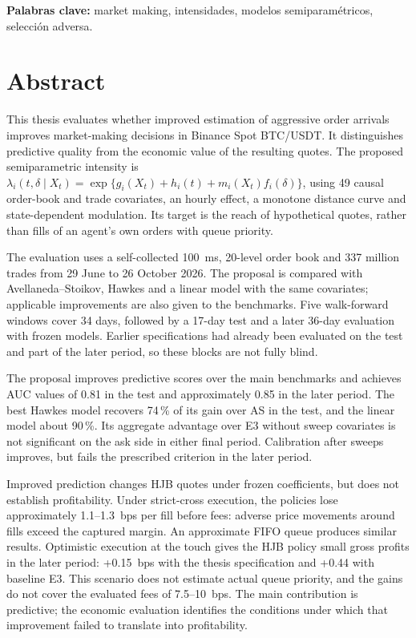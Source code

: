 \medskip
\noindent\textbf{Palabras clave:} market making, intensidades, modelos semiparamétricos, selección adversa.

\chapter*{Abstract}

This thesis evaluates whether improved estimation of aggressive order arrivals improves market-making decisions in Binance Spot BTC/USDT. It distinguishes predictive quality from the economic value of the resulting quotes. The proposed semiparametric intensity is
$\lambda_i(t,\delta\mid X_t)=\exp\{g_i(X_t)+h_i(t)+m_i(X_t)f_i(\delta)\}$,
using 49 causal order-book and trade covariates, an hourly effect, a monotone distance curve and state-dependent modulation. Its target is the reach of hypothetical quotes, rather than fills of an agent's own orders with queue priority.

The evaluation uses a self-collected 100~ms, 20-level order book and 337 million trades from 29 June to 26 October 2026. The proposal is compared with Avellaneda--Stoikov, Hawkes and a linear model with the same covariates; applicable improvements are also given to the benchmarks. Five walk-forward windows cover 34 days, followed by a 17-day test and a later 36-day evaluation with frozen models. Earlier specifications had already been evaluated on the test and part of the later period, so these blocks are not fully blind.

The proposal improves predictive scores over the main benchmarks and achieves AUC values of 0.81 in the test and approximately 0.85 in the later period. The best Hawkes model recovers 74\,\% of its gain over AS in the test, and the linear model about 90\,\%. Its aggregate advantage over E3 without sweep covariates is not significant on the ask side in either final period. Calibration after sweeps improves, but fails the prescribed criterion in the later period.

Improved prediction changes HJB quotes under frozen coefficients, but does not establish profitability. Under strict-cross execution, the policies lose approximately 1.1--1.3~bps per fill before fees: adverse price movements around fills exceed the captured margin. An approximate FIFO queue produces similar results. Optimistic execution at the touch gives the HJB policy small gross profits in the later period: +0.15~bps with the thesis specification and +0.44 with baseline E3. This scenario does not estimate actual queue priority, and the gains do not cover the evaluated fees of 7.5--10~bps. The main contribution is predictive; the economic evaluation identifies the conditions under which that improvement failed to translate into profitability.
